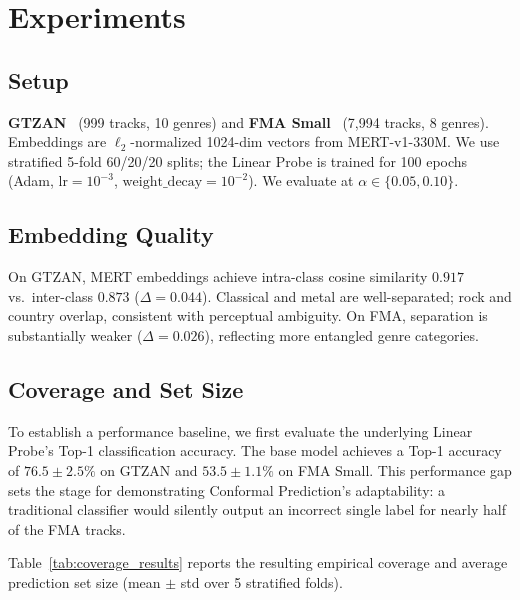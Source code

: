 
\section{Experiments}
\label{sec:experiments}

\subsection{Setup}

\textbf{GTZAN}~\cite{tzanetakis2002gtzan} (999 tracks, 10 genres) and
\textbf{FMA Small}~\cite{defferrard2017fma} (7,994 tracks, 8 genres). Embeddings
are $\ell_2$-normalized 1024-dim vectors from MERT-v1-330M. We use stratified
5-fold 60/20/20 splits; the Linear Probe is trained for 100 epochs (Adam,
$\text{lr}=10^{-3}$, $\text{weight\_decay}=10^{-2}$). We evaluate at $\alpha
\in \{0.05, 0.10\}$.

\subsection{Embedding Quality}

On GTZAN, MERT embeddings achieve intra-class cosine similarity $0.917$ vs.\
inter-class $0.873$ ($\Delta = 0.044$). Classical and metal are well-separated;
rock and country overlap, consistent with perceptual ambiguity. On FMA,
separation is substantially weaker ($\Delta = 0.026$), reflecting more entangled
genre categories.

\subsection{Coverage and Set Size}

To establish a performance baseline, we first evaluate the underlying Linear Probe's Top-1 classification accuracy.
The base model achieves a Top-1 accuracy of $76.5 \pm 2.5\%$ on GTZAN and $53.5 \pm 1.1\%$ on FMA Small.
This performance gap sets the stage for demonstrating Conformal Prediction's adaptability: a traditional classifier would silently output an incorrect single label for nearly half of the FMA tracks.

Table~\ref{tab:coverage_results} reports the resulting empirical coverage and average
prediction set size (mean $\pm$ std over 5 stratified folds).

